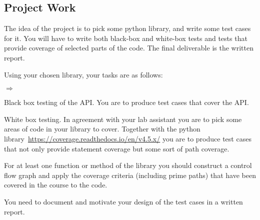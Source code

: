 \documentclass[a4paper]{article}
\begin{document}
\subsection*{Project Work}

The idea of the project is to pick some python library, and write some
test cases for it. You will have to write both black-box and white-box
tests and tests that provide coverage of selected parts of the
code. The final deliverable is the written report.%


Using your chosen library, your tasks are as follows:
\begin{list}{$\Rightarrow$}{} 
    \item  Black box testing of the API. You are to produce test cases
      that cover the API.
    \item White box testing. In agreement with your lab assistant you
      are to pick some areas of code in your library to
      cover. Together with the python
      library~\url{https://coverage.readthedocs.io/en/v4.5.x/} you are
      to produce test cases that not only provide statement coverage
      but some sort of path coverage.
    \item For at least one function or method of the library you
      should construct a control flow graph and apply the coverage
      criteria (including prime paths)
      that have been covered in the course to the code. 
    \item You need to document and motivate your design of the test cases in
      a written report. 
\end{list}
\end{document}
